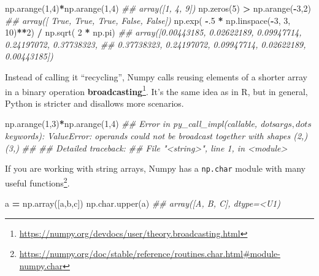\documentclass[
  12pt,
  krantz2]{krantz}
\makeatletter
\newenvironment{Shaded}{\begin{snugshade}}{\end{snugshade}}
\newcommand{\CommentTok}[1]{\textcolor[rgb]{0.37,0.37,0.37}{\textit{#1}}}
\newcommand{\DecValTok}[1]{\textcolor[rgb]{0.06,0.06,0.06}{#1}}
\newcommand{\FloatTok}[1]{\textcolor[rgb]{0.06,0.06,0.06}{#1}}
\newcommand{\NormalTok}[1]{#1}
\newcommand{\OperatorTok}[1]{\textcolor[rgb]{0.43,0.43,0.43}{\textbf{#1}}}
\newcommand{\StringTok}[1]{\textcolor[rgb]{0.5,0.5,0.5}{#1}}
\renewcommand{\href}[2]{#2\footnote{\url{#1}}}
\newenvironment{kframe}{%
\medskip{}
\setlength{\fboxsep}{.8em}
 \def\at@end@of@kframe{}%
 \ifinner\ifhmode%
  \def\at@end@of@kframe{\end{minipage}}%
  \begin{minipage}{\columnwidth}%
 \fi\fi%
 \def\FrameCommand##1{\hskip\@totalleftmargin \hskip-\fboxsep
 \colorbox{shadecolor}{##1}\hskip-\fboxsep
     \hskip-\linewidth \hskip-\@totalleftmargin \hskip\columnwidth}%
 \MakeFramed {\advance\hsize-\width
   \@totalleftmargin\z@ \linewidth\hsize
   \@setminipage}}%
 {\par\unskip\endMakeFramed%
 \at@end@of@kframe}
\renewenvironment{Shaded}{\begin{kframe}}{\end{kframe}}
\makeatother
\begin{document}
\begin{Shaded}
\begin{Highlighting}[]
\NormalTok{np.arange(}\DecValTok{1}\NormalTok{,}\DecValTok{4}\NormalTok{)}\OperatorTok{*}\NormalTok{np.arange(}\DecValTok{1}\NormalTok{,}\DecValTok{4}\NormalTok{)}
\CommentTok{\#\# array([1, 4, 9])}
\NormalTok{np.zeros(}\DecValTok{5}\NormalTok{) }\OperatorTok{\textgreater{}}\NormalTok{ np.arange(}\OperatorTok{{-}}\DecValTok{3}\NormalTok{,}\DecValTok{2}\NormalTok{)}
\CommentTok{\#\# array([ True,  True,  True, False, False])}
\NormalTok{np.exp( }\OperatorTok{{-}}\FloatTok{.5} \OperatorTok{*}\NormalTok{ np.linspace(}\OperatorTok{{-}}\DecValTok{3}\NormalTok{, }\DecValTok{3}\NormalTok{, }\DecValTok{10}\NormalTok{)}\OperatorTok{**}\DecValTok{2}\NormalTok{) }\OperatorTok{/}\NormalTok{ np.sqrt( }\DecValTok{2} \OperatorTok{*}\NormalTok{ np.pi)}
\CommentTok{\#\# array([0.00443185, 0.02622189, 0.09947714, 0.24197072, 0.37738323,}
\CommentTok{\#\#        0.37738323, 0.24197072, 0.09947714, 0.02622189, 0.00443185])}
\end{Highlighting}
\end{Shaded}

Instead of calling it ``recycling'', Numpy calls reusing elements of a shorter array in a binary operation \href{https://numpy.org/devdocs/user/theory.broadcasting.html}{\textbf{broadcasting}}. It's the same idea as in R, but in general, Python is stricter and disallows more scenarios.

\begin{Shaded}
\begin{Highlighting}[]
\NormalTok{np.arange(}\DecValTok{1}\NormalTok{,}\DecValTok{3}\NormalTok{)}\OperatorTok{*}\NormalTok{np.arange(}\DecValTok{1}\NormalTok{,}\DecValTok{4}\NormalTok{)}
\CommentTok{\#\# Error in py\_call\_impl(callable, dots$args, dots$keywords): ValueError: operands could not be broadcast together with shapes (2,) (3,) }
\CommentTok{\#\# }
\CommentTok{\#\# Detailed traceback:}
\CommentTok{\#\#   File "\textless{}string\textgreater{}", line 1, in \textless{}module\textgreater{}}
\end{Highlighting}
\end{Shaded}

If you are working with string arrays, Numpy has a \href{https://numpy.org/doc/stable/reference/routines.char.html\#module-numpy.char}{\texttt{np.char} module with many useful functions}.

\begin{Shaded}
\begin{Highlighting}[]
\NormalTok{a }\OperatorTok{=}\NormalTok{ np.array([}\StringTok{\textquotesingle{}a\textquotesingle{}}\NormalTok{,}\StringTok{\textquotesingle{}b\textquotesingle{}}\NormalTok{,}\StringTok{\textquotesingle{}c\textquotesingle{}}\NormalTok{])}
\NormalTok{np.char.upper(a)}
\CommentTok{\#\# array([\textquotesingle{}A\textquotesingle{}, \textquotesingle{}B\textquotesingle{}, \textquotesingle{}C\textquotesingle{}], dtype=\textquotesingle{}\textless{}U1\textquotesingle{})}
\end{Highlighting}
\end{Shaded}
\end{document}
